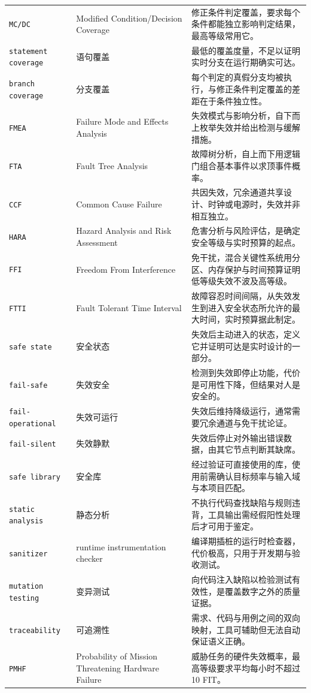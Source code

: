 \documentclass[12pt,a4paper,fontset=fandol]{ctexbook}
\newcommand{\Tp}[1]{\texttt{#1}}
\begin{document}
\begin{longtable}{@{} >{\raggedright\arraybackslash}p{} >{\raggedright\arraybackslash}p{} >{\raggedright\arraybackslash}p{}@{}}
\Tp{MC/DC} & Modified Condition/Decision Coverage & 修正条件判定覆盖，要求每个条件都能独立影响判定结果，最高等级常用它。 \\
\Tp{statement coverage} & 语句覆盖 & 最低的覆盖度量，不足以证明实时分支在运行期确实可达。 \\
\Tp{branch coverage} & 分支覆盖 & 每个判定的真假分支均被执行，与修正条件判定覆盖的差距在于条件独立性。 \\
\Tp{FMEA} & Failure Mode and Effects Analysis & 失效模式与影响分析，自下而上枚举失效并给出检测与缓解措施。 \\
\Tp{FTA} & Fault Tree Analysis & 故障树分析，自上而下用逻辑门组合基本事件以求顶事件概率。 \\
\Tp{CCF} & Common Cause Failure & 共因失效，冗余通道共享设计、时钟或电源时，失效并非相互独立。 \\
\Tp{HARA} & Hazard Analysis and Risk Assessment & 危害分析与风险评估，是确定安全等级与实时预算的起点。 \\
\Tp{FFI} & Freedom From Interference & 免干扰，混合关键性系统用分区、内存保护与时间预算证明低等级失效不波及高等级。 \\
\Tp{FTTI} & Fault Tolerant Time Interval & 故障容忍时间间隔，从失效发生到进入安全状态所允许的最大时间，实时预算据此制定。 \\
\Tp{safe state} & 安全状态 & 失效后主动进入的状态，定义它并证明可达是实时设计的一部分。 \\
\Tp{fail-safe} & 失效安全 & 检测到失效即停止功能，代价是可用性下降，但结果对人是安全的。 \\
\Tp{fail-operational} & 失效可运行 & 失效后维持降级运行，通常需要冗余通道与免干扰论证。 \\
\Tp{fail-silent} & 失效静默 & 失效后停止对外输出错误数据，由其它节点判断其缺席。 \\
\Tp{safe library} & 安全库 & 经过验证可直接使用的库，使用前需确认目标频率与输入域与本项目匹配。 \\
\Tp{static analysis} & 静态分析 & 不执行代码查找缺陷与规则违背，工具输出需经假阳性处理后才可用于鉴定。 \\
\Tp{sanitizer} & runtime instrumentation checker & 编译期插桩的运行时检查器，代价极高，只用于开发期与验收测试。 \\
\Tp{mutation testing} & 变异测试 & 向代码注入缺陷以检验测试有效性，是覆盖数字之外的质量证据。 \\
\Tp{traceability} & 可追溯性 & 需求、代码与用例之间的双向映射，工具可辅助但无法自动保证语义正确。 \\
\Tp{PMHF} & Probability of Mission Threatening Hardware Failure & 威胁任务的硬件失效概率，最高等级要求平均每小时不超过 10 FIT。 \\

\end{longtable}
\end{document}
